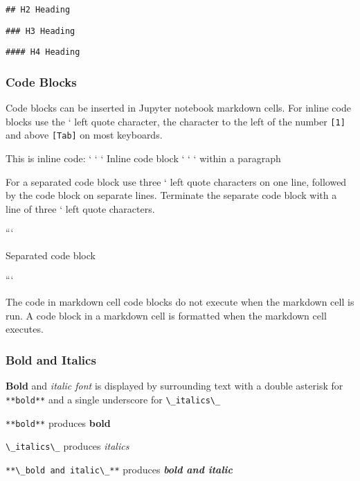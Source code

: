 \documentclass{book}
\newcommand{\passthrough}[1]{#1}
\begin{document}
\begin{lstlisting}
## H2 Heading
\end{lstlisting}

\begin{lstlisting}
### H3 Heading
\end{lstlisting}

\begin{lstlisting}
#### H4 Heading
\end{lstlisting}

\hypertarget{code-blocks}{%
\subsubsection{Code Blocks}\label{code-blocks}}

Code blocks can be inserted in Jupyter notebook markdown cells. For
inline code blocks use the ` left quote character, the character to the
left of the number \passthrough{\lstinline![1]!} and above
\passthrough{\lstinline![Tab]!} on most keyboards.

This is inline code: ` ` ` Inline code block ` ` ` within a paragraph

For a separated code block use three ` left quote characters on one
line, followed by the code block on separate lines. Terminate the
separate code block with a line of three ` left quote characters.

```

Separated code block

```

The code in markdown cell code blocks do not execute when the markdown
cell is run. A code block in a markdown cell is formatted when the
markdown cell executes.

\hypertarget{bold-and-italics}{%
\subsubsection{Bold and Italics}\label{bold-and-italics}}

\textbf{Bold} and \emph{italic font} is displayed by surrounding text
with a double asterisk for \passthrough{\lstinline!**bold**!} and a
single underscore for \passthrough{\lstinline!\_italics\_!}

\passthrough{\lstinline!**bold**!} produces \textbf{bold}

\passthrough{\lstinline!\_italics\_!} produces \emph{italics}

\passthrough{\lstinline!**\_bold and italic\_**!} produces
\textbf{\emph{bold and italic}}
\end{document}
